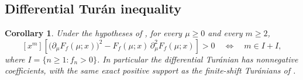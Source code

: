 \documentclass[11pt,a4paper]{amsart}
\numberwithin{equation}{section}
\theoremstyle{plain}
\newtheorem{corollary}[theorem]{Corollary}
\theoremstyle{definition}
\begin{document}
\subsection{Differential Tur\'an inequality}\label{subsec:differential-turan-inequality}

\begin{corollary}
\label{cor:differential}
Under the hypotheses of , for every \(\mu\ge0\) and every
\(m\ge2\),
\[
 [x^m]\left[
 \bigl(\partial_\mu F_f(\mu;x)\bigr)^2
 -F_f(\mu;x)\,\partial_\mu^2F_f(\mu;x)
 \right]>0
 \quad\Longleftrightarrow\quad
 m\in I+I,
\]
where \(I=\{n\ge1:f_n>0\}\).  In particular the differential Tur\'anian has
nonnegative coefficients, with the same exact positive support as the
finite-shift Tur\'anians of .
\end{corollary}
\end{document}
